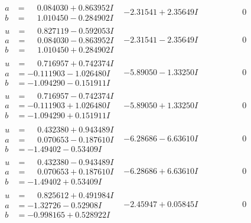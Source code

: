 \documentclass[1p]{elsarticle_modified}
\theoremstyle{definition}
\begin{document}
$$\begin{array}{c|c|c}
\begin{aligned}
a &= \phantom{-}0.084030 + 0.863952 I \\
b &= \phantom{-}1.010450 - 0.284902 I\end{aligned}
 & -2.31541 + 2.35649 I & \phantom{-0.000000 } 0 \\ \hline\begin{aligned}
u &= \phantom{-}0.827119 - 0.592053 I \\
a &= \phantom{-}0.084030 - 0.863952 I \\
b &= \phantom{-}1.010450 + 0.284902 I\end{aligned}
 & -2.31541 - 2.35649 I & \phantom{-0.000000 } 0 \\ \hline\begin{aligned}
u &= \phantom{-}0.716957 + 0.742374 I \\
a &= -0.111903 - 1.026480 I \\
b &= -1.094290 - 0.151911 I\end{aligned}
 & -5.89050 - 1.33250 I & \phantom{-0.000000 } 0 \\ \hline\begin{aligned}
u &= \phantom{-}0.716957 - 0.742374 I \\
a &= -0.111903 + 1.026480 I \\
b &= -1.094290 + 0.151911 I\end{aligned}
 & -5.89050 + 1.33250 I & \phantom{-0.000000 } 0 \\ \hline\begin{aligned}
u &= \phantom{-}0.432380 + 0.943489 I \\
a &= \phantom{-}0.070653 - 0.187610 I \\
b &= -1.49402 - 0.53409 I\end{aligned}
 & -6.28686 - 6.63610 I & \phantom{-0.000000 } 0 \\ \hline\begin{aligned}
u &= \phantom{-}0.432380 - 0.943489 I \\
a &= \phantom{-}0.070653 + 0.187610 I \\
b &= -1.49402 + 0.53409 I\end{aligned}
 & -6.28686 + 6.63610 I & \phantom{-0.000000 } 0 \\ \hline\begin{aligned}
u &= \phantom{-}0.825612 + 0.491984 I \\
a &= -1.32726 - 0.52908 I \\
b &= -0.998165 + 0.528922 I\end{aligned}
 & -2.45947 + 0.05845 I & \phantom{-0.000000 } 0 \\ \hline\begin{aligned}

\end{aligned}
\end{array}$$
\end{document}
